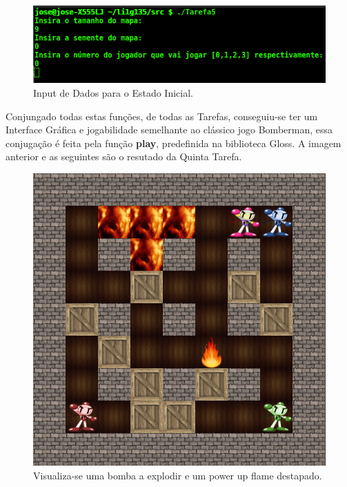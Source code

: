 \documentclass[4apaper]{report}
\begin{document}
\begin{figure}[ht]
	\centering
	\includegraphics[scale=0.70]{monad.jpg}
	\caption{Input de Dados para o Estado Inicial.}
	\label{img1:monadT5}
\end{figure}

Conjungado todas estas funções, de todas as Tarefas, conseguiu-se ter um Interface Gráfica e jogabilidade semelhante ao clássico jogo Bomberman, essa conjugação é feita pela função \textbf{play}, predefinida na biblioteca Gloss. A imagem anterior e as seguintes são o resutado da Quinta Tarefa.

\begin{figure}[ht]
	\centering
	\includegraphics[scale=0.45]{1.jpg}
	\caption{Visualiza-se uma bomba a explodir e um power up flame destapado.}
	\label{img2:1T5}
\end{figure}
\end{document}
